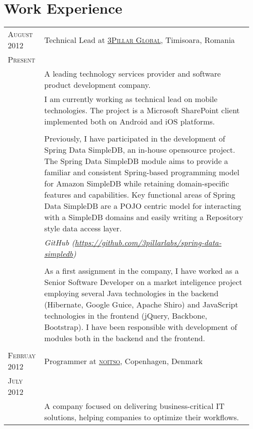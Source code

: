 \documentclass[a4paper,10pt]{article}
\begin{document}
\section{Work Experience}
\begin{longtable}{p{2.5cm}|p{11cm}}

 \raggedleft \textsc{August 2012} & Technical Lead at
 \textsc{\href{http://www.3pillarglobal.com/}{3Pillar Global}}, Timisoara, Romania
 \\\raggedleft \textsc{Present}\\& 
 \footnotesize{A leading technology services provider and software product development company.}\\
& \footnotesize{I am currently working as technical lead on mobile technologies. The project is a Microsoft SharePoint client implemented both on Android and iOS platforms.} \\ \\
& \footnotesize{Previously, I have participated in the development of Spring Data SimpleDB, an in-house opensource project. The Spring Data SimpleDB module aims to provide a familiar and consistent Spring-based programming model for Amazon SimpleDB while retaining domain-specific features and capabilities. Key functional areas of Spring Data SimpleDB are a POJO centric model for interacting with a SimpleDB domains and easily writing a Repository style data access layer.} \\
& \footnotesize{\emph{GitHub (\url{https://github.com/3pillarlabs/spring-data-simpledb})}} \\ \\
& \footnotesize{As a first assignment in the company, I have worked as a Senior Software Developer on a market inteligence project employing several Java technologies in the backend (Hibernate, Google Guice, Apache Shiro) and JavaScript technologies in the
frontend (jQuery, Backbone, Bootstrap). I have been responsible with development of modules both in the backend and the frontend.}\\
\multicolumn{2}{c}{} \\ 

 \raggedleft \textsc{Februay 2012} & Programmer at
 \textsc{\href{http://www.noitso.dk/}{noitso}}, Copenhagen, Denmark
 \\\raggedleft \textsc{July 2012}\\& 
 \footnotesize{A company focused on delivering business-critical IT solutions, helping companies to optimize their workflows.}\\


\end{longtable}
\end{document}

